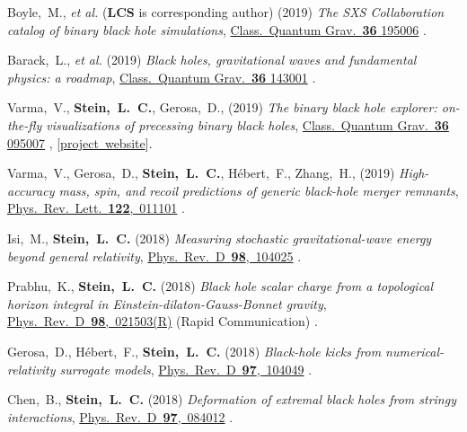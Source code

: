 \begin{etaremune}[start=\value{pubCounter}]
\item
  Boyle,~M., {\it et al.} ({\bf LCS} is corresponding author)
  (2019)
  {\it The SXS Collaboration catalog of binary black hole simulations},
  \href{https://doi.org/10.1088/1361-6382/ab34e2}{Class.~Quantum Grav.~{\bf 36} 195006}
  .
\item
  Barack,~L., {\it et al.}
  (2019)
  {\it Black holes, gravitational waves and fundamental physics: a roadmap},
  \href{https://doi.org/10.1088/1361-6382/ab0587}{Class.~Quantum Grav.~{\bf 36} 143001}
  .
\item
  Varma,~V., {\bf Stein,~L.~C.}, Gerosa,~D.,
  (2019)
  {\it The binary black hole explorer: on-the-fly visualizations of precessing binary black holes},
  \href{https://doi.org/10.1088/1361-6382/ab0ee9}{Class.~Quantum Grav.~{\bf 36} 095007}
  ,
  [\href{https://vijayvarma392.github.io/binaryBHexp/}{project~website}].
\item
  Varma,~V., Gerosa,~D., {\bf Stein,~L.~C.}, H\'ebert,~F.,  Zhang,~H.,
  (2019)
  {\it High-accuracy mass, spin, and recoil predictions of generic black-hole merger remnants},
  \href{https://doi.org/10.1103/PhysRevLett.122.011101}{Phys.~Rev.~Lett.~{\bf 122},~011101}
  .
 \item
  Isi,~M., {\bf Stein,~L.~C.}
  (2018)
  {\it Measuring stochastic gravitational-wave energy beyond general relativity},
  \href{https://doi.org/10.1103/PhysRevD.98.104025}{Phys.~Rev.~D~{\bf 98},~104025}
  .
\item
  Prabhu,~K., {\bf Stein,~L.~C.}
  (2018)
  {\it Black hole scalar charge from a topological horizon integral in
    Einstein-dilaton-Gauss-Bonnet gravity},
  \href{https://doi.org/10.1103/PhysRevD.98.021503}{Phys.~Rev.~D~{\bf 98},~021503(R)}
  (Rapid Communication)
  .
\item
  Gerosa,~D., H\'ebert,~F., {\bf Stein,~L.~C.}
  (2018)
  {\it Black-hole kicks from numerical-relativity surrogate models},
  \href{https://doi.org/10.1103/PhysRevD.97.104049}{Phys.~Rev.~D~{\bf 97},~104049}
  .
\item
  Chen,~B., {\bf Stein,~L.~C.}
  (2018)
  {\it Deformation of extremal black holes from stringy interactions},
  \href{https://doi.org/10.1103/PhysRevD.97.084012}{Phys.~Rev.~D~{\bf 97},~084012}
  .
\item

\end{etaremune}
